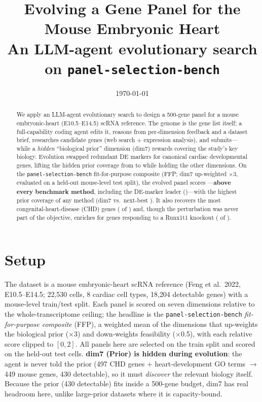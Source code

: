 \documentclass[11pt]{article}
\title{\vspace{-1.5em}Evolving a Gene Panel for the Mouse Embryonic Heart\\
\large An LLM-agent evolutionary search on \texttt{panel-selection-bench}}
\author{}
\date{\today}
\begin{document}
\maketitle
\vspace{-2.5em}

\begin{abstract}
\noindent We apply an LLM-agent evolutionary search to design a 500-gene panel for a mouse
embryonic-heart (E10.5--E14.5) scRNA reference. The genome is the gene list itself; a full-capability
coding agent edits it, reasons from per-dimension feedback and a dataset brief, researches candidate
genes (web search + expression analysis), and submits---while a \emph{hidden} ``biological prior''
dimension (dim7) rewards covering the study's key biology. Evolution swapped \nAdded{} redundant
DE markers for canonical cardiac developmental genes, lifting the hidden prior coverage from
\seedDimSeven{} to \bestDimSeven{} while holding the other dimensions. On the
\texttt{panel-selection-bench} fit-for-purpose composite (FFP; dim7 up-weighted $\times$3, evaluated
on a held-out mouse-level test split), the evolved panel scores \evFFP{}---\textbf{above every
benchmark method}, including the DE-marker leader (\deBenchFFP)---with the highest prior coverage of
any method (dim7 \evDimSeven{} vs.\ next-best \maxRefDimSeven). It also recovers the most
congenital-heart-disease (CHD) genes (\evCHD{} of \chdN) and, though the perturbation was never part
of the objective, enriches for genes responding to a Runx1t1 knockout (\evKO{} of \koN).
\end{abstract}

\section{Setup}
The dataset is a mouse embryonic-heart scRNA reference (Feng et al.\ 2022, E10.5--E14.5; 22{,}530
cells, 8 cardiac cell types, 18{,}204 detectable genes) with a mouse-level train/test split. Each
panel is scored on seven dimensions relative to the whole-transcriptome ceiling; the headline is the
\texttt{panel-selection-bench} \emph{fit-for-purpose composite} (FFP), a weighted mean of the
dimensions that up-weights the biological prior ($\times$3) and down-weights feasibility ($\times$0.5),
with each relative score clipped to $[0,2]$. All panels here are selected on the train split and scored
on the held-out test cells. \textbf{dim7 (Prior) is hidden during evolution}: the agent is never told
the prior (497 CHD genes + heart-development GO terms $\to$ 449 mouse genes, 430 detectable), so it must
\emph{discover} the relevant biology itself. Because the prior (430 detectable) fits inside a 500-gene
budget, dim7 has real headroom here, unlike large-prior datasets where it is capacity-bound.
\end{document}
